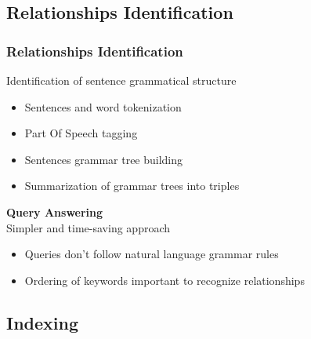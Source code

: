 \documentclass{beamer}
\begin{document}
\subsection{Relationships Identification}

\begin{frame}
\frametitle{Relationships Identification}
Identification of sentence grammatical structure
\begin{itemize}
\item Sentences and word tokenization
\item Part Of Speech tagging
\item Sentences grammar tree building
\item Summarization of grammar trees into triples
\end{itemize}
\bigskip
{\color{red}\bfseries{Query Answering}}\\
Simpler and time-saving approach
\begin{itemize}
\item Queries don't follow natural language grammar rules
\item Ordering of keywords important to recognize relationships
\end{itemize}
\end{frame}

\subsection{Indexing}
\end{document}
